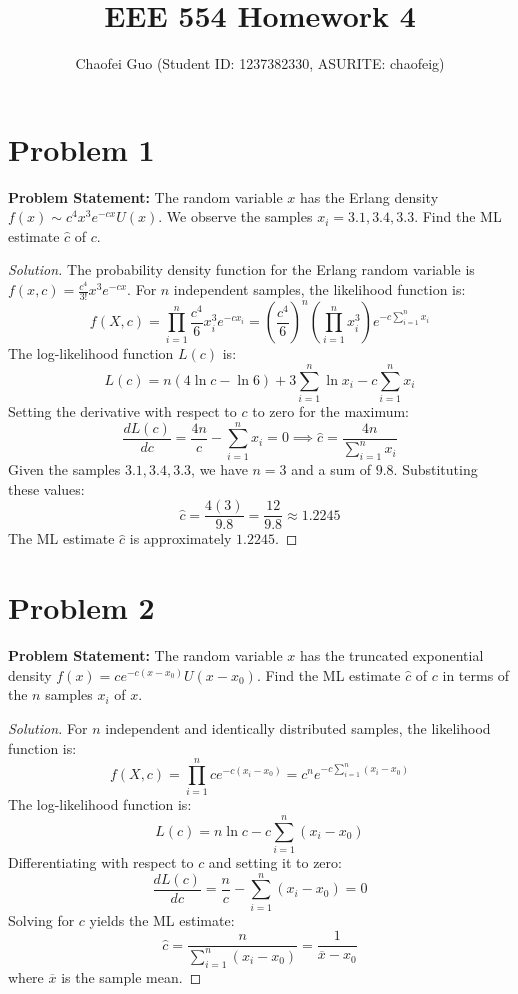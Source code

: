 \documentclass{article}
\title{EEE 554 Homework 4}
\author{Chaofei Guo (Student ID: 1237382330, ASURITE: chaofeig)}
\date{}
\begin{document}
\maketitle

\section*{Problem 1}
\textbf{Problem Statement:}
The random variable $x$ has the Erlang density $f(x) \sim c^4 x^3 e^{-cx} U(x)$. We observe the samples $x_i = 3.1, 3.4, 3.3$. Find the ML estimate $\hat{c}$ of $c$.

\begin{proof}[Solution]
	The probability density function for the Erlang random variable is $f(x, c) = \frac{c^4}{3!} x^3 e^{-cx}$. For $n$ independent samples, the likelihood function is:
	\[ f(X, c) = \prod_{i=1}^n \frac{c^4}{6} x_i^3 e^{-cx_i} = \left( \frac{c^4}{6} \right)^n \left( \prod_{i=1}^n x_i^3 \right) e^{-c \sum_{i=1}^n x_i} \]
	The log-likelihood function $L(c)$ is:
	\[ L(c) = n(4\ln c - \ln 6) + 3 \sum_{i=1}^n \ln x_i - c \sum_{i=1}^n x_i \]
	Setting the derivative with respect to $c$ to zero for the maximum:
	\[ \frac{dL(c)}{dc} = \frac{4n}{c} - \sum_{i=1}^n x_i = 0 \implies \hat{c} = \frac{4n}{\sum_{i=1}^n x_i} \]
	Given the samples $3.1, 3.4, 3.3$, we have $n=3$ and a sum of $9.8$. Substituting these values:
	\[ \hat{c} = \frac{4(3)}{9.8} = \frac{12}{9.8} \approx 1.2245 \]
	The ML estimate $\hat{c}$ is approximately $1.2245$.
\end{proof}


\section*{Problem 2}
\textbf{Problem Statement:}
The random variable $x$ has the truncated exponential density $f(x) = ce^{-c(x-x_0)} U(x-x_0)$. Find the ML estimate $\hat{c}$ of $c$ in terms of the $n$ samples $x_i$ of $x$.

\begin{proof}[Solution]
	For $n$ independent and identically distributed samples, the likelihood function is:
	\[ f(X, c) = \prod_{i=1}^n c e^{-c(x_i - x_0)} = c^n e^{-c \sum_{i=1}^n (x_i - x_0)} \]
	The log-likelihood function is:
	\[ L(c) = n \ln c - c \sum_{i=1}^n (x_i - x_0) \]
	Differentiating with respect to $c$ and setting it to zero:
	\[ \frac{dL(c)}{dc} = \frac{n}{c} - \sum_{i=1}^n (x_i - x_0) = 0 \]
	Solving for $c$ yields the ML estimate:
	\[ \hat{c} = \frac{n}{\sum_{i=1}^n (x_i - x_0)} = \frac{1}{\overline{x} - x_0} \]
	where $\overline{x}$ is the sample mean.
\end{proof}
\end{document}
